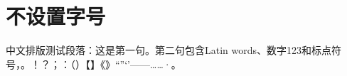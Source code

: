 \documentclass[a4paper,10pt,UTF8,scheme=chinese,zihao=false]{ctexart}
\begin{document}
\section{不设置字号}
中文排版测试段落：这是第一句。第二句包含Latin words、数字123和标点符号，。！？；：（）【】《》“”‘’——……·。
\end{document}

